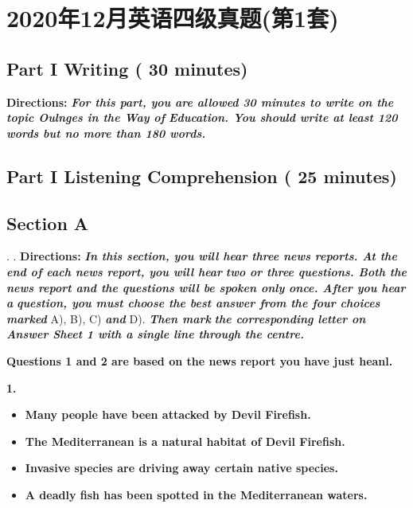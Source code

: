 \documentclass[UTF8,11pt]{ctexart}
\begin{document}
\section*{2020年12月英语四级真题(第1套)}
\subsection*{\textbf{Part I} \textbf{Writing} \textbf{( 30 minutes)}}


\textbf{Directions: }\textbf{\textit{For this part, you are allowed 30 minutes to write on the topic Oulnges in the Way of}} \textbf{\textit{Education. You should write at least 120 words but no more than 180 words.}}


\subsection*{\textbf{Part I} \textbf{Listening Comprehension} \textbf{( 25 minutes)}}


\subsection*{\textbf{Section A}}


. . \textbf{Directions: }\textbf{\textit{In this section, you will hear three news reports. At the end of each news report, you will hear}} \textbf{\textit{two or three questions. Both the news report and the questions will be spoken only once. After you hear a}} \textbf{\textit{question, you must choose the best answer from the four choices marked }}A), B), C) \textbf{\textit{and }}D). \textbf{\textit{Then mark}} \textbf{\textit{the corresponding letter on Answer Sheet 1 with a single line through the centre.}}


\textbf{Questions 1 and 2 are based on the news report you have just heanl.}


\textbf{1.}


\begin{itemize}[leftmargin=2em,itemsep=.2em,topsep=.4em]\item[A.] \textbf{Many people have been attacked by Devil Firefish.}
\item[B.] \textbf{The Mediterranean is a natural habitat of Devil Firefish.}
\item[C.] \textbf{Invasive species are driving away certain native species.}
\item[D.] \textbf{A deadly fish has been spotted in the Mediterranean waters.}
\end{itemize}
\end{document}
